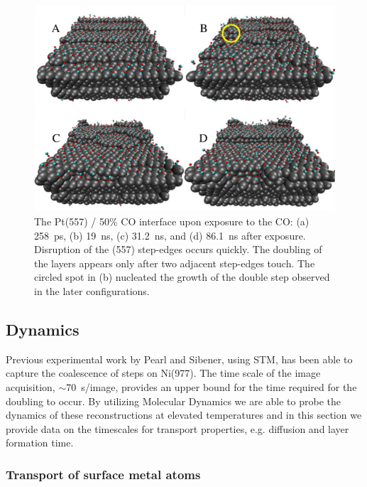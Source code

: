 \begin{figure}[p!]
\centering
\includegraphics[width=\linewidth]{../figures/chap2/doubleLayer.pdf}
\caption{The Pt(557) / 50\% CO interface upon exposure to the CO: (a)
  258~ps, (b) 19~ns, (c) 31.2~ns, and (d) 86.1~ns after
  exposure. Disruption of the (557) step-edges occurs quickly.  The
  doubling of the layers appears only after two adjacent step-edges
  touch.  The circled spot in (b) nucleated the growth of the double
  step observed in the later configurations.}
  \label{fig:reconstruct}
\end{figure}

\subsection{Dynamics}
Previous experimental work by Pearl and Sibener\citep{Pearl:2001ca}, using
STM, has been able to capture the coalescence of steps on Ni(977). The
time scale of the image acquisition, $\sim$70~s/image, provides an
upper bound for the time required for the doubling to occur. By
utilizing Molecular Dynamics we are able to probe the dynamics of
these reconstructions at elevated temperatures and in this section we
provide data on the timescales for transport properties,
e.g. diffusion and layer formation time.


\subsubsection{Transport of surface metal atoms}

